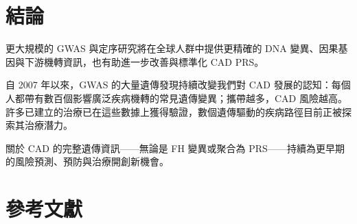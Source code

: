 \documentclass[12pt,a4paper]{article}
\begin{document}
\section{結論}

更大規模的 GWAS 與定序研究將在全球人群中提供更精確的 DNA 變異、因果基因與下游機轉資訊，也有助進一步改善與標準化 CAD PRS。

自 2007 年以來，GWAS 的大量遺傳發現持續改變我們對 CAD 發展的認知：每個人都帶有數百個影響廣泛疾病機轉的常見遺傳變異；攜帶越多，CAD 風險越高。許多已建立的治療已在這些數據上獲得驗證，數個遺傳驅動的疾病路徑目前正被探索其治療潛力。

關於 CAD 的完整遺傳資訊——無論是 FH 變異或聚合為 PRS——持續為更早期的風險預測、預防與治療開創新機會。

\section{參考文獻}
\end{document}
